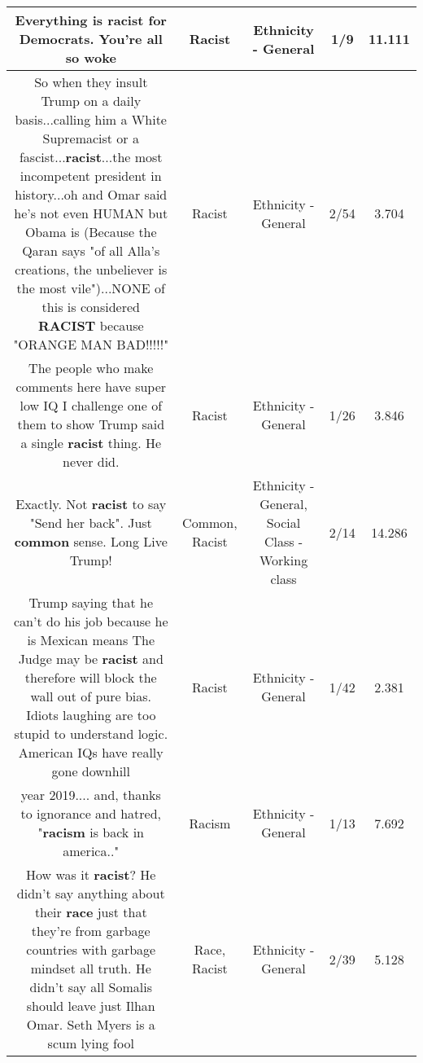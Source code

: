 \documentclass[11pt]{article}
\newlength\mylength
\begin{document}
\begin{center}
\begin{longtable}{|C{.65\mylength}|C{.30\mylength}|C{.12\mylength}|C{.12\mylength}|C{.12\mylength}|}
  \small Everything is \textbf{racist} for Democrats. You're all so woke\normalsize   & Racist & Ethnicity - General & 1/9 & 11.111 \\  \hline
  \small So when they insult Trump on a daily basis...calling him a White Supremacist or a fascist...\textbf{racist}...the most incompetent president in history...oh and Omar said he's not even HUMAN but Obama is (Because the Qaran says "of all Alla's creations, the unbeliever is the most vile")...NONE of this is considered \textbf{RACIST} because "ORANGE MAN BAD!!!!!"\normalsize   & Racist & Ethnicity - General & 2/54 & 3.704 \\  \hline
  \small The people who make comments here have super low IQ I challenge one of them to show Trump said a single \textbf{racist} thing. He never did.\normalsize   & Racist & Ethnicity - General & 1/26 & 3.846 \\  \hline
  \small Exactly. Not \textbf{racist} to say "Send her back". Just \textbf{common} sense. Long Live Trump!\normalsize   & Common, Racist & Ethnicity - General, Social Class - Working class & 2/14 & 14.286 \\  \hline
  \small Trump saying that he can't do his job because he is Mexican means The Judge may be \textbf{racist} and therefore will block the wall out of pure bias.  Idiots laughing are too stupid to understand logic. American IQs have really gone downhill\normalsize   & Racist & Ethnicity - General & 1/42 & 2.381 \\  \hline
  \small year 2019.... and, thanks to ignorance and hatred, "\textbf{racism} is back in america.."\normalsize   & Racism & Ethnicity - General & 1/13 & 7.692 \\  \hline
  \small How was it \textbf{racist}? He didn't say anything about their \textbf{race} just that they're from garbage countries with garbage mindset all truth.  He didn't say all Somalis should leave just Ilhan Omar.  Seth Myers is a scum lying fool\normalsize   & Race, Racist & Ethnicity - General & 2/39 & 5.128 \\  \hline

\end{longtable}
\end{center}
\end{document}
